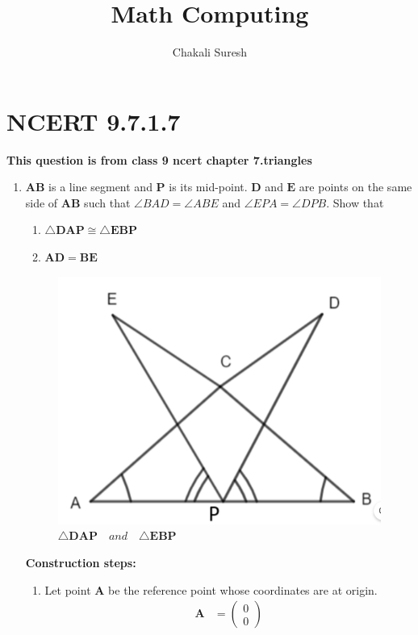 \documentclass[11pt, a4paper]{article}
\title{ \textbf{Math Computing}}
\author{ Chakali Suresh }
\date{}
\newcommand{\myvec}[1]{\ensuremath{\begin{pmatrix}#1\end{pmatrix}}}
\let\vec\mathbf
\begin{document}
\vspace{-\baselineskip}
\maketitle

\section*{NCERT 9.7.1.7}

\textbf{This question is from class 9 ncert chapter 7.triangles}
\begin{enumerate}
	\item $\vec{AB}$ is a line segment and $\vec{P}$ is its mid-point. $\vec{D}$ and $\vec{E}$ are points on the same side of $\vec{AB}$ such that $\angle BAD = \angle ABE$ and $\angle EPA = \angle DPB$. Show that
		\begin{enumerate}
			\item $\triangle \vec{DAP} \cong  \triangle \vec{EBP}$
			\item $\vec{AD} = \vec{BE}$
\end{enumerate}
\begin{figure}[H]
    \includegraphics[width=\columnwidth]{figs/mc.png}
	\caption{$\triangle  \vec{DAP} \hspace{12pt} and \hspace{12pt} \triangle \vec{EBP}$}
 \label{fig:fig1}
\end{figure}
\pagebreak
\textbf{Construction steps:}
\\
		\begin{enumerate}[label=(\roman*)]
			\item Let point $\vec{A}$ be the reference point whose coordinates are at origin. 
\begin{align}
\vec{A} &= \myvec{0 \\ 0}
\end{align}


\end{enumerate}
\end{enumerate}
\end{document}
